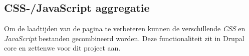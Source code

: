 \subsection{CSS-/JavaScript aggregatie}\label{aggregatie}

Om de laadtijden van de pagina te verbeteren kunnen de verschillende \textit{CSS} en \textit{JavaScript} bestanden gecombineerd worden. Deze functionaliteit zit in Drupal core en zettenwe voor dit project aan.
